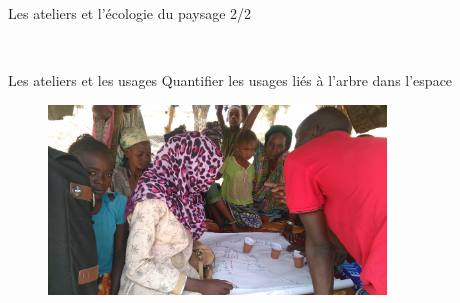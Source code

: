 \documentclass[newPxFont]{beamer}
\begin{document}
\begin{frame}[c]{Les ateliers et l'écologie du paysage 2/2}
\vspace{-1cm}
\begin{figure}
  \\
\end{figure}
\end{frame}


\begin{frame}[c]{Les ateliers et les usages}
\vspace{-1cm}
Quantifier les usages liés à l'arbre dans l'espace
\begin{figure}
  \centering
  \includegraphics[width = 0.8\textwidth]{img/DSC_1793}
\end{figure}

\end{frame}

\end{document}
